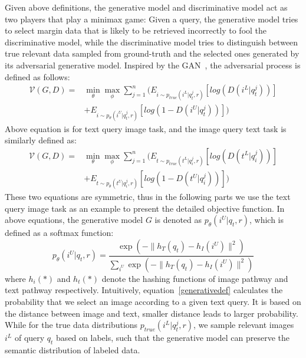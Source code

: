 \documentclass[journal]{IEEEtran}
\begin{document}
Given above definitions, the generative model and discriminative model act as two players that play a minimax game: Given a query, the generative model tries to select margin data that is likely to be retrieved incorrectly to fool the discriminative model, while the discriminative model tries to distinguish between true relevant data sampled from ground-truth and the selected ones generated by its adversarial generative model. Inspired by the GAN~\cite{gan,infogan,videogan,obgan}, the adversarial process is defined as follows:
\begin{equation}
\label{minimaxgame_ti}
\begin{split}
\mathcal{V}(G,D) = &\min_{\theta}\max_{\phi}\sum_{j=1}^{n}(E_{i\sim p_{true}(i^L|q_t^j,r)}[log(D(i^L|q_t^j))]\\
&+E_{i\sim p_{\theta}(i^U|q_t^j,r)}[log(1-D(i^U|q_t^j))])
\end{split}
\end{equation}
Above equation is for text query image task, and the image query text task is similarly defined as:
\begin{equation}
\label{minimaxgame_it}
\begin{split}
\mathcal{V}(G,D) = &\min_{\theta}\max_{\phi}\sum_{j=1}^{n}(E_{t\sim p_{true}(t^L|q_i^j,r)}[log(D(t^L|q_i^j))]\\
&+E_{t\sim p_{\theta}(t^U|q_i^j,r)}[log(1-D(t^U|q_i^j))])
\end{split}
\end{equation}
These two equations are symmetric, thus in the following parts we use the text query image task as an example to present the detailed objective function. In above equations, the generative model $G$ is denoted as $p_{\theta}(i^U|q_t,r)$, which is defined as a softmax function:
\begin{equation}
\label{generativedef}
p_{\theta}(i^U|q_t,r) = \frac{\exp(-\|h_T(q_t)-h_I(i^U)\|^2)}{\sum_{i^U}\exp(-\|h_T(q_t)-h_I(i^U)\|^2)}
\end{equation}
where $h_i(\ast)$ and $h_t(\ast)$ denote the hashing functions of image pathway and text pathway respectively. Intuitively, equation~\ref{generativedef} calculates the probability that we select an image according to a given text query. It is based on the distance between image and text, smaller distance leads to larger probability. While for the true data distributions $p_{true}(i^L|q_t^j,r)$, we sample relevant images $i^L$ of query $q_t$ based on labels, such that the generative model can preserve the semantic distribution of labeled data.
\end{document}

